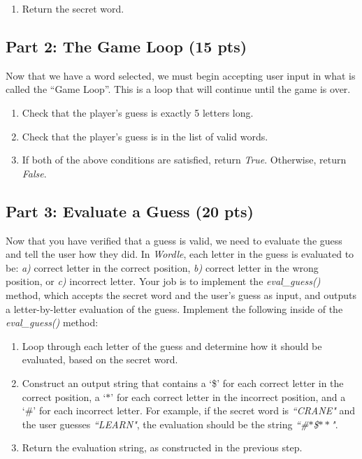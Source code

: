 \documentclass{article}
\begin{document}
\begin{enumerate}
\itemsep0em 
\item{Return the secret word.}
\end{enumerate}

\subsection{Part 2: The Game Loop (15 pts)}
\hspace{\parindent}Now that we have a word selected, we must begin accepting user input in what is called the ``Game Loop''. This is a loop that will continue until the game is over.

\begin{enumerate}
\itemsep0em 
\item{Check that the player's guess is exactly 5 letters long.}
\item{Check that the player's guess is in the list of valid words.}
\item{If both of the above conditions are satisfied, return \emph{True}. Otherwise, return \emph{False}.}
\end{enumerate}

\subsection{Part 3: Evaluate a Guess (20 pts)}
\hspace{\parindent}Now that you have verified that a guess is valid, we need to evaluate the guess and tell the user how they did. In \emph{Wordle}, each letter in the guess is evaluated to be: \emph{a)} correct letter in the correct position, \emph{b)} correct letter in the wrong position, or \emph{c)} incorrect letter. Your job is to implement the \emph{eval\_guess()} method, which accepts the secret word and the user's guess as input, and outputs a letter-by-letter evaluation of the guess. Implement the following inside of the \emph{eval\_guess()} method:

\begin{enumerate}
\itemsep0em 
\item{Loop through each letter of the guess and determine how it should be evaluated, based on the secret word.}
\item{Construct an output string that contains a `\$' for each correct letter in the correct position, a `$\ast$' for each correct letter in the incorrect position, and a `\#' for each incorrect letter. For example, if the secret word is \emph{``CRANE"} and the user guesses \emph{``LEARN"}, the evaluation should be the string \emph{``\#$\ast$\$$\ast \ast$"}.}
\item{Return the evaluation string, as constructed in the previous step.}
\end{enumerate}
\end{document}
